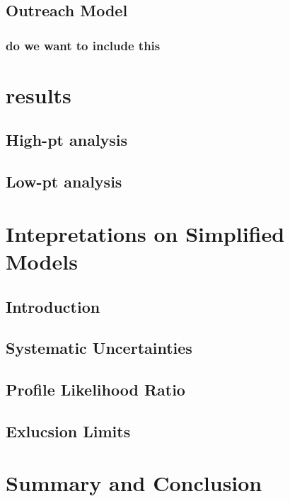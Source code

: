 \section{Outreach Model}
\subsection{do we want to include this}

\chapter{results}
\section{High-pt analysis}
\section{Low-pt analysis}

\chapter{Intepretations on Simplified Models}
\section{Introduction}
\section{Systematic Uncertainties}
\section{Profile Likelihood Ratio}
\section{Exlucsion Limits}

\chapter{Summary and Conclusion}

